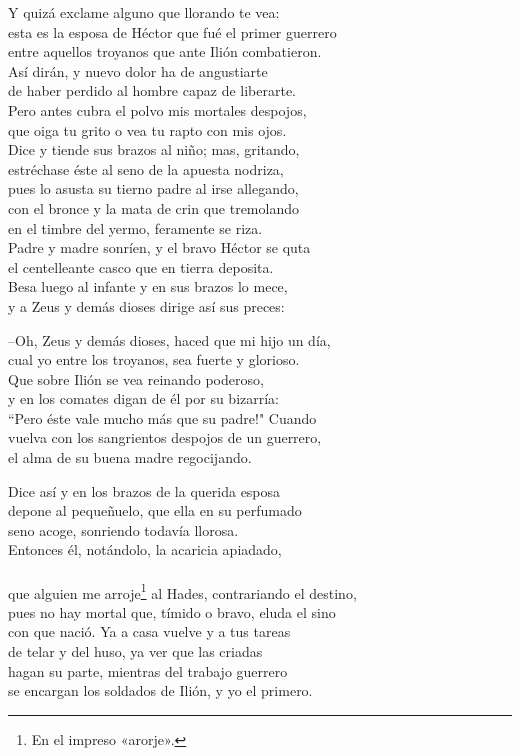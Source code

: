 Y quizá exclame alguno que llorando te vea:\\
esta es la esposa de Héctor que fué el primer guerrero\\
entre aquellos troyanos que ante Ilión combatieron.\\
Así dirán, y nuevo dolor ha de angustiarte\\
de haber perdido al hombre capaz de liberarte.\\
Pero antes cubra el polvo mis mortales despojos,\\
que oiga tu grito o vea tu rapto con mis ojos.\\
Dice y tiende sus brazos al niño; mas, gritando,\\
estréchase éste al seno de la apuesta nodriza,\\
pues lo asusta su tierno padre al irse allegando,\\
con el bronce y la mata de crin que tremolando\\
en el timbre del yermo, feramente se riza.\\
Padre y madre sonríen, y el bravo Héctor se quta\\
el centelleante casco que en tierra deposita.\\
Besa luego al infante y en sus brazos lo mece,\\
y a Zeus y demás dioses dirige así sus preces:\par
--Oh, Zeus y demás dioses, haced que mi hijo un día,\\
cual yo entre los troyanos, sea fuerte y glorioso.\\
Que sobre Ilión se vea reinando poderoso,\\
y en los comates digan de él por su bizarría:\\
``Pero éste vale mucho más que su padre!" Cuando\\
vuelva con los sangrientos despojos de un guerrero,\\
el alma de su buena madre regocijando.\par
Dice así y en los brazos de la querida esposa\\
depone al pequeñuelo, que ella en su perfumado\\
seno acoge, sonriendo todavía llorosa.\\
Entonces él, notándolo, la acaricia apiadado,\\
\\
que alguien me arroje\footnote{En el impreso «arorje».} al Hades, contrariando el destino,\\
pues no hay mortal que, tímido o bravo, eluda el sino\\
con que nació. Ya a casa vuelve y a tus tareas\\
de telar y del huso, ya  ver que las criadas\\
hagan su parte, mientras del trabajo guerrero\\
se encargan los soldados de Ilión, y yo el primero.\par
\pend
\endnumbering